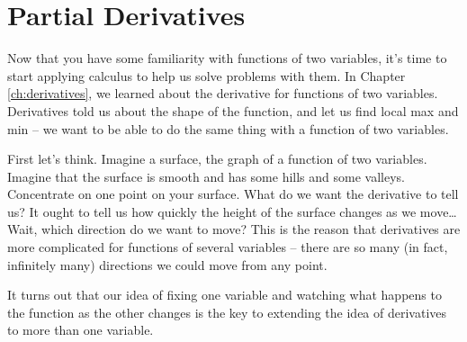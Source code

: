 \section{Partial Derivatives}
\label{sec:derivatives}

Now that you have some familiarity with functions of two variables, it's time to start applying calculus to help us solve problems with them. In Chapter \ref{ch:derivatives}, we learned about the derivative for functions of two variables. Derivatives told us about the shape of the function, and let us find local max and min – we want to be able to do the same thing with a function of two variables.

First let's think. Imagine a surface, the graph of a function of two variables. Imagine that the surface is smooth and has some hills and some valleys. Concentrate on one point on your surface. What do we want the derivative to tell us? It ought to tell us how quickly the height of the surface changes as we move… Wait, which direction do we want to move? This is the reason that derivatives are more complicated for functions of several variables – there are so many (in fact, infinitely many) directions we could move from any point.

It turns out that our idea of fixing one variable and watching what happens to the function as the other changes is the key to extending the idea of derivatives to more than one variable.

